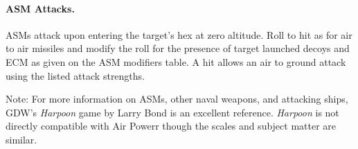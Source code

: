 \begin{advancedrules}
\paragraph{ASM Attacks.} ASMs attack upon entering the target's hex at zero altitude. Roll to hit as for air to air missiles and modify the roll for the presence of target launched decoys and ECM as given on the ASM modifiers table. A hit allows an air to ground attack using the listed attack strengths.

Note: For more information on ASMs, other naval weapons, and attacking ships, GDW's {\itshape Harpoon} game by Larry Bond is an excellent reference. {\itshape Harpoon} is not directly compatible with Air Powerr though the scales and subject matter are similar.
    
\end{advancedrules}



